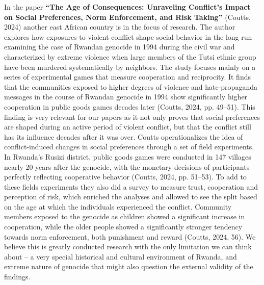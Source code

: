 \documentclass[14pt]{article}
\theoremstyle{remark}
\begin{document}
In the paper \textbf{``The Age of Consequences: Unraveling Conflict's Impact on Social Preferences, Norm Enforcement, and Risk Taking''} (Coutts, 2024) another east African country is in the focus of research. The author explores how exposures to violent conflict shape social behavior in the long run examining the case of Rwandan genocide in 1994 during the civil war and characterized by extreme violence when large members of the Tutsi ethnic group have been murdered systematically by neighbors. The study focuses mainly on a series of experimental games that measure cooperation and reciprocity. It finds that the communities exposed to higher degrees of violence and hate-propaganda messages in the course of Rwandan genocide in 1994 show significantly higher cooperation in public goods games decades later (Coutts, 2024, pp. 49--51). This finding is very relevant for our papers as it not only proves that social preferences are shaped during an active period of violent conflict, but that the conflict still has its influence decades after it was over. Coutts operationalizes the idea of conflict-induced changes in social preferences through a set of field experiments. In Rwanda's Rusizi district, public goods games were conducted in 147 villages nearly 20 years after the genocide, with the monetary decisions of participants perfectly reflecting cooperative behavior (Coutts, 2024, pp. 51--53). To add to these fields experiments they also did a survey to measure trust, cooperation and perception of risk, which enriched the analyses and allowed to see the split based on the age at which the individuals experienced the conflict. Community members exposed to the genocide as children showed a significant increase in cooperation, while the older people showed a significantly stronger tendency towards norm enforcement, both punishment and reward (Coutts, 2024, 56). We believe this is greatly conducted research with the only limitation we can think about -- a very special historical and cultural environment of Rwanda, and extreme nature of genocide that might also question the external validity of the findings.
\end{document}
